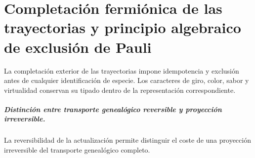 \chapter{Completación fermiónica de las trayectorias y principio algebraico de exclusión de Pauli}
\label{chap:parte-iv-56}

La completación exterior de las trayectorias impone idempotencia y exclusión antes de cualquier identificación de especie. Los caracteres de giro, color, sabor y virtualidad conservan su tipado dentro de la representación correspondiente.





\paragraph{Distinción entre transporte genealógico reversible y proyección irreversible.} La reversibilidad de la actualización permite distinguir el coste de una proyección irreversible del transporte genealógico completo.
